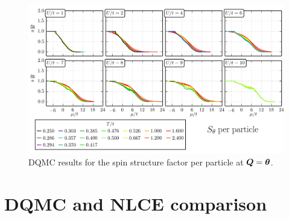 \begin{figure}
    \centering
\includegraphics[width=1.0\textwidth]{../figures/hubbard-data/dataplots/QMC_Final/sth_n_10.png}
\caption{ DQMC results for the spin structure factor per particle at
$\bm{Q}=\bm{\theta}$. } 
\label{fig:QMCsth}
\end{figure}
 


\section{ DQMC and NLCE comparison} 

